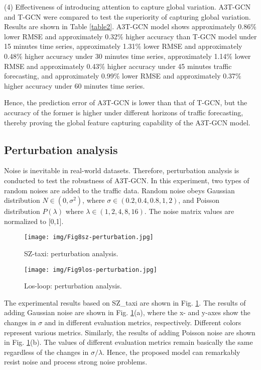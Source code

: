 \documentclass[10pt,journal,compsoc]{IEEEtran}
\begin{document}
\par (4) Effectiveness of introducing attention to capture global variation. A3T-GCN and T-GCN were compared to test the superiority of capturing global variation. Results are shown in Table \ref{table2}. A3T-GCN model shows approximately 0.86\% lower RMSE and approximately 0.32\% higher accuracy than T-GCN model under 15 minutes time series, approximately 1.31\% lower RMSE and approximately 0.48\% higher accuracy under 30 minutes time series, approximately 1.14\% lower RMSE and approximately 0.43\% higher accuracy under 45 minutes traffic forecasting, and approximately 0.99\% lower RMSE and approximately 0.37\% higher accuracy under 60 minutes time series.
\par Hence, the prediction error of A3T-GCN is lower than that of T-GCN, but the accuracy of the former is higher under different horizons of traffic forecasting, thereby proving the global feature capturing capability of the A3T-GCN model.


\subsection{ Perturbation analysis}
\par Noise is inevitable in real-world datasets. Therefore, perturbation analysis is conducted to test the robustness of A3T-GCN. In this experiment, two types of random noises are added to the traffic data. Random noise obeys Gaussian distribution $N\in (0,\sigma^2)$, where $\sigma\in(0.2,0.4,0.8,1,2)$, and Poisson distribution $P(\lambda)$ where $\lambda\in(1,2,4,8,16)$. The noise matrix values are normalized to [0,1].

\begin{figure}[ht]
\begin{center}
   \texttt{[image: img/Fig8sz-perturbation.jpg]}
   \end{center}
   \caption{ SZ-taxi: perturbation analysis.}
\label{fig:8}
\end{figure}

\begin{figure}[ht]
\begin{center}
   \texttt{[image: img/Fig9los-perturbation.jpg]}
   \end{center}
   \caption{Los-loop: perturbation analysis.}
\label{fig:9}
\end{figure}

\par The experimental results based on SZ\_taxi are shown in Fig. \ref{fig:8}. The results of adding Gaussian noise are shown in Fig. \ref{fig:8}(a), where the x- and y-axes show the changes in $\sigma$ and in different evaluation metrics, respectively. Different colors represent various metrics. Similarly, the results of adding Poisson noise are shown in Fig. \ref{fig:8}(b). The values of different evaluation metrics remain basically the same regardless of the changes in $\sigma/\lambda$. Hence, the proposed model can remarkably resist noise and process strong noise problems. 
\end{document}
